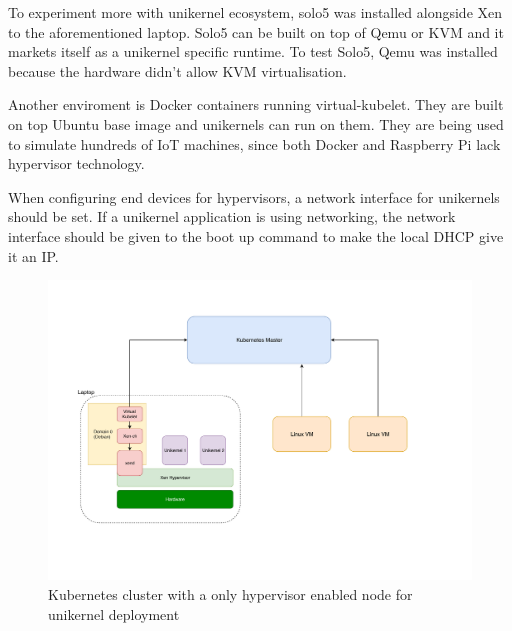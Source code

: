To experiment more with unikernel ecosystem, solo5 was installed alongside Xen to the aforementioned laptop. Solo5 can be built on top of Qemu or KVM and it markets itself as a unikernel specific runtime. To test Solo5, Qemu was installed because the hardware didn't allow KVM virtualisation.

Another enviroment is Docker containers running virtual-kubelet. They are built on top Ubuntu base image and unikernels can run on them. They are being used to simulate hundreds of IoT machines, since both Docker and Raspberry Pi lack hypervisor technology.

When configuring end devices for hypervisors, a network interface for unikernels should be set. If a unikernel application is using networking, the network interface should be given to the boot up command to make the local DHCP give it an IP.


\begin{figure}[htpb]
  
    \centering
    \includegraphics[width=1.2\textwidth]{figures/arch_new.pdf}
    \caption{ Kubernetes cluster with a only hypervisor enabled node for unikernel deployment} \label{fig:hypervisor}
  \end{figure}

\pagebreak